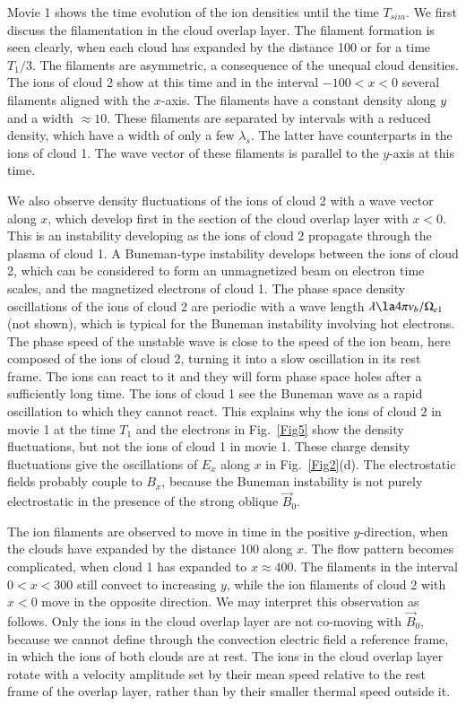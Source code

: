 \documentclass[structabstract]{aa}
\begin{document}
Movie 1 shows the time evolution of the ion densities until the time $T_{sim}$.
We first discuss the filamentation in the cloud overlap layer. The filament 
formation is seen clearly, when each cloud has expanded by the distance 100 
or for a time $T_1/3$. The filaments are asymmetric, a consequence 
of the unequal cloud densities. The ions of cloud 2 show at this time and 
in the interval $-100 < x < 0$ several filaments aligned with the $x$-axis. 
The filaments have a constant density along $y$ and a width $\approx 10$. 
These filaments are separated by intervals with a reduced density, which 
have a width of only a few $\lambda_s$. The latter have counterparts in
the ions of cloud 1. The wave vector of these filaments is parallel to the 
$y$-axis at this time.

We also observe density fluctuations of the ions of cloud 2 with a wave
vector along $x$, which develop first in the section of the cloud overlap 
layer with $x<0$. This is an instability developing as the ions of cloud 2
propagate through the plasma of cloud 1. A Buneman-type instability 
\citep{Buneman} develops between the ions of cloud 2, which can be considered 
to form an unmagnetized beam on electron time scales, and the magnetized
electrons of cloud 1. The phase space density oscillations of the ions of 
cloud 2 are periodic with a wave length $\lambda \la 4 \pi v_b / \Omega_{e1}$ 
(not shown), which is typical for the Buneman instability involving hot 
electrons. The 
phase speed of the unstable wave is close to the speed of the ion beam, here 
composed of the ions of cloud 2, turning it into a slow oscillation in its 
rest frame. The ions can react to it and they will form phase space holes 
after a sufficiently long time. The ions of cloud 1 see the Buneman wave as 
a rapid oscillation to which they cannot react. This explains why the ions 
of cloud 2 in movie 1 at the time $T_1$ and the electrons in Fig.~\ref{Fig5} 
show the density fluctuations, but not the ions of cloud 1 in movie 1. These 
charge density fluctuations give the oscillations of $E_x$ along $x$ in 
Fig.~\ref{Fig2}(d). The electrostatic fields probably couple to $B_x$, 
because the Buneman instability is not purely electrostatic in the presence
of the strong oblique $\vec{B}_0$.
  
The ion filaments are observed to move in time in the positive $y$-direction, 
when the clouds have expanded by the distance 100 along $x$. The flow 
pattern becomes complicated, when cloud 1 has expanded to $x\approx 400$. 
The filaments in the interval $0 < x < 300$ still convect to increasing $y$, 
while the ion filaments of cloud 2 with $x<0$ move in the opposite direction. 
We may interpret this observation as follows. Only the ions in the cloud 
overlap layer are not co-moving with $\vec{B}_0$, because we cannot define 
through the convection electric field a reference frame, in which the ions 
of both clouds are at rest. The ions in the cloud overlap layer rotate with 
a velocity amplitude set by their mean speed relative to the rest frame of 
the overlap layer, rather than by their smaller thermal speed outside it. 
\end{document}
